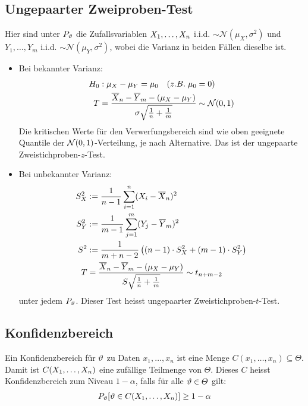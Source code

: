 \subsection*{Ungepaarter Zweiproben-Test}
Hier sind unter $P_\vartheta$ die Zufallsvariablen $X_1, \dots, X_n$ i.i.d. $\sim
  \mathcal{N} (\mu_X, \sigma^2)$ und $Y_1, \dots, Y_m$ i.i.d. $\sim \mathcal{N}
  (\mu_Y, \sigma^2)$, wobei die Varianz in beiden Fällen dieselbe ist.
\begin{itemize}
  \item Bei bekannter Varianz:
        \begin{align*}
          H_0 & : \mu_X - \mu_Y = \mu_0 \quad  (z.B. \; \mu_0 = 0)                                                                                \\
          T   & = \frac{\overline{X}_n - \overline{Y}_m -  (\mu_X - \mu_Y)}{\sigma \sqrt{\frac{1}{n} + \frac{1}{m}}} \sim \mathcal{N} (0, 1)
        \end{align*}
        Die kritischen Werte für den Verwerfungsbereich sind wie oben
        geeignete Quantile der $\mathcal{N} (0, 1)$-Verteilung, je nach
        Alternative. Das ist der ungepaarte Zweistichproben-$z$-Test.

  \item Bei unbekannter Varianz:
        \begin{align*}
          S_X^2 & := \frac{1}{n-1} \sum_{i = 1}^n  (X_i - \overline{X}_n)^2                                                                 \\
          S_Y^2 & := \frac{1}{m-1} \sum_{j = 1}^m  (Y_j - \overline{Y}_m)^2                                                      \\
          S^2   & := \frac{1}{m+n-2} \left(  (n-1) \cdot S_X^2 +  (m-1) \cdot S_Y^2 \right)                                      \\
          T     & = \frac{\overline{X}_n - \overline{Y}_m -  (\mu_X - \mu_Y)}{S \sqrt{\frac{1}{n} + \frac{1}{m}}} \sim t_{n+m-2}
        \end{align*}
        unter jedem $P_\vartheta$. Dieser Test heisst ungepaarter Zweistichproben-$t$-Test.
\end{itemize}
\subsection*{Konfidenzbereich}
Ein Konfidenzbereich für $\vartheta$ zu Daten $x_1, \dots, x_n$ ist eine Menge $C
  (x_1, \dots, x_n) \subseteq \varTheta$. Damit ist $C (X_1, \dots, X_n)$ eine
zufällige Teilmenge von $\varTheta$. Dieses $C$ heisst Konfidenzbereich zum
Niveau $1 - \alpha$, falls für alle $\vartheta \in \varTheta$ gilt:
\begin{align*}
  P_\vartheta [\vartheta \in C (X_1, \dots, X_n)] \geq 1 - \alpha
\end{align*}
\BoxStart{}
